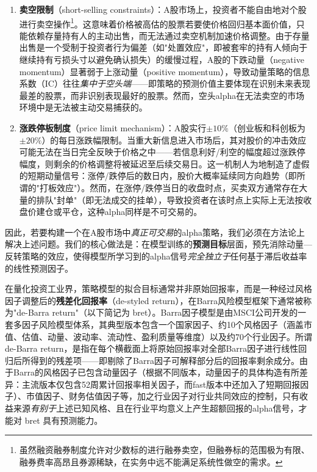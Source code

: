 \documentclass{article}
\begin{document}
\begin{enumerate}
    \item \textbf{卖空限制}（short-selling constraints）：A股市场上，投资者不能自由地对个股进行卖空操作\footnote{虽然融资融券制度允许对少数标的进行融券卖空，但融券标的范围极为有限、融券费率高昂且券源稀缺，在实务中远不能满足系统性做空的需求。}。这意味着价格被高估的股票若要使价格回归基本面价值，只能依赖存量持有人的主动出售，而无法通过卖空机制加速价格调整。由于存量出售是一个受制于投资者行为偏差（如"处置效应"，即被套牢的持有人倾向于继续持有亏损头寸以避免确认损失）的缓慢过程，A股的下跌动量（negative momentum）显著弱于上涨动量（positive momentum），导致动量策略的信息系数（IC）往往\textit{集中于空头端}——即策略的预测价值主要体现在识别未来表现最差的股票，而非识别表现最好的股票。然而，空头alpha在无法卖空的市场环境中是无法被主动交易捕获的。

    \item \textbf{涨跌停板制度}（price limit mechanism）：A股实行$\pm 10\%$（创业板和科创板为$\pm 20\%$）的每日涨跌幅限制。当重大新信息进入市场后，其对股价的冲击效应可能无法在当日完全反映于价格之中——若信息利好/利空的幅度超过涨跌停幅度，则剩余的价格调整将被延迟至后续交易日。这一机制人为地制造了虚假的短期动量信号：涨停/跌停后的数日内，股价大概率延续同方向趋势（即所谓的"打板效应"）。然而，在涨停/跌停当日的收盘时点，买卖双方通常存在大量的排队"封单"（即无法成交的挂单），导致投资者在该时点上实际上无法按收盘价建仓或平仓，这种alpha同样是不可交易的。
\end{enumerate}

因此，若要构建一个在A股市场中\textit{真正可交易}的alpha策略，我们必须在方法论上解决上述问题。我们的核心做法是：在模型训练的\textbf{预测目标}层面，预先消除动量—反转策略的效应，使得模型所学习到的alpha信号\textit{完全独立于}任何基于滞后收益率的线性预测因子。

在量化投资工业界，策略模型的拟合目标通常并非原始回报率，而是一种经过风格因子调整后的\textbf{残差化回报率}（de-styled return），在Barra风险模型框架下通常被称为"de-Barra return"（以下简记为 bret）。Barra因子模型是由MSCI公司开发的一套多因子风险模型体系，其典型版本包含一个国家因子、约10个风格因子（涵盖市值、估值、动量、波动率、流动性、盈利质量等维度）以及约70个行业因子。所谓 de-Barra return，是指在每个横截面上将原始回报率对全部Barra因子进行线性回归后所得到的残差项——即剔除了Barra因子可解释部分后的回报率剩余成分。由于Barra的风格因子已包含动量因子（根据不同版本，动量因子的具体构造有所差异：主流版本仅包含52周累计回报率相关因子，而fast版本中还加入了短期回报因子）、市值因子、财务估值因子等，加之行业因子对行业共同效应的控制，只有收益来源\textit{有别于}上述已知风格、且在行业平均意义上产生超额回报的alpha信号，才能对 bret 具有预测能力。
\end{document}
